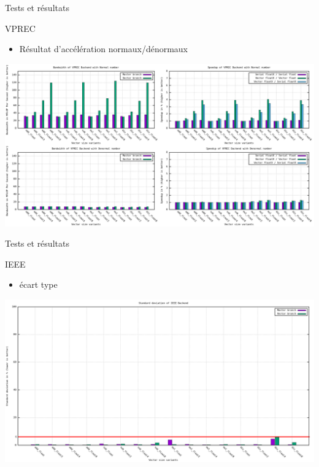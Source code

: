 \documentclass{beamer}
\begin{document}
\begin{frame}{Tests et résultats}

  \begin{block}{VPREC}
    \begin{itemize}
    \item Résultat d'accélération normaux/dénormaux
    \end{itemize}
    \centering\includegraphics[scale=0.23]{../ressources/vm_vprec.png}
  \end{block}

\end{frame}

\begin{frame}{Tests et résultats}

  \begin{block}{IEEE}
    \begin{itemize}
    \item écart type
    \end{itemize}
    \centering\includegraphics[scale=0.2]{../ressources/vm_ieee_stddev.png}
  \end{block}

\end{frame}
\end{document}
